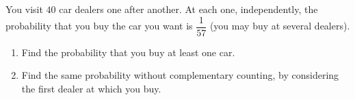 You visit $40$ car dealers one after another. At each one, independently, the probability that you buy the car you want is $\dfrac{1}{57}$ (you may buy at several dealers).
\begin{enumerate}
\item[(a)] Find the probability that you buy at least one car.
\item[(b)] Find the same probability without complementary counting, by considering the first dealer at which you buy.
\end{enumerate}
